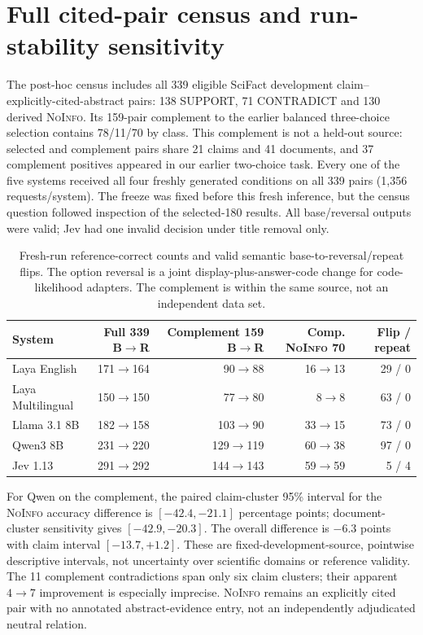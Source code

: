 \section{Full cited-pair census and run-stability sensitivity}
\label{app:scifact3-census}
The post-hoc census includes all 339 eligible SciFact development claim--explicitly-cited-abstract pairs: 138 SUPPORT, 71 CONTRADICT and 130 derived \textsc{NoInfo}. Its 159-pair complement to the earlier balanced three-choice selection contains 78/11/70 by class. This complement is not a held-out source: selected and complement pairs share 21 claims and 41 documents, and 37 complement positives appeared in our earlier two-choice task. Every one of the five systems received all four freshly generated conditions on all 339 pairs (1,356 requests/system). The freeze was fixed before this fresh inference, but the census question followed inspection of the selected-180 results. All base/reversal outputs were valid; Jev had one invalid decision under title removal only.

\begin{table}[h]
\centering\small\setlength{\tabcolsep}{4pt}
\begin{tabular}{lrrrr}
\toprule
System & Full 339 B$\to$R & Complement 159 B$\to$R & Comp. \textsc{NoInfo} 70 & Flip / repeat \\
\midrule
Laya English & 171$\to$164 & 90$\to$88 & 16$\to$13 & 29 / 0 \\
Laya Multilingual & 150$\to$150 & 77$\to$80 & 8$\to$8 & 63 / 0 \\
Llama 3.1 8B & 182$\to$158 & 103$\to$90 & 33$\to$15 & 73 / 0 \\
Qwen3 8B & 231$\to$220 & 129$\to$119 & 60$\to$38 & 97 / 0 \\
Jev 1.13 & 291$\to$292 & 144$\to$143 & 59$\to$59 & 5 / 4 \\
\bottomrule
\end{tabular}
\caption{Fresh-run reference-correct counts and valid semantic base-to-reversal/repeat flips. The option reversal is a joint display-plus-answer-code change for code-likelihood adapters. The complement is within the same source, not an independent data set.}
\end{table}

For Qwen on the complement, the paired claim-cluster 95\% interval for the \textsc{NoInfo} accuracy difference is $[-42.4,-21.1]$ percentage points; document-cluster sensitivity gives $[-42.9,-20.3]$. The overall difference is $-6.3$ points with claim interval $[-13.7,+1.2]$. These are fixed-development-source, pointwise descriptive intervals, not uncertainty over scientific domains or reference validity. The 11 complement contradictions span only six claim clusters; their apparent $4\to7$ improvement is especially imprecise. \textsc{NoInfo} remains an explicitly cited pair with no annotated abstract-evidence entry, not an independently adjudicated neutral relation.

